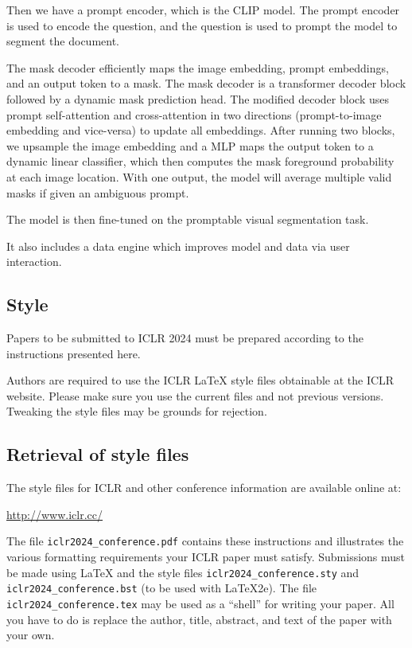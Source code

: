 \documentclass{article} %
\begin{document}
Then we have a prompt encoder, which is the CLIP model. The prompt encoder is used to encode the question, and the question is used to prompt the model to segment the document.

The mask decoder efficiently maps the image embedding, prompt embeddings, and an output token to a mask. The mask decoder is a transformer decoder block followed by a dynamic mask prediction head. The modified decoder block uses prompt self-attention and cross-attention in two directions (prompt-to-image embedding and vice-versa) to update all embeddings. After running two blocks, we upsample the image embedding and a MLP maps the output token to a dynamic linear classifier, which then computes the mask foreground probability at each image location. With one output, the model will average multiple valid masks if given an ambiguous prompt.

The model is then fine-tuned on the promptable visual segmentation task.

It also includes a data engine which improves model and data via user interaction. 

\subsection{Style}

Papers to be submitted to ICLR 2024 must be prepared according to the
instructions presented here.


Authors are required to use the ICLR \LaTeX{} style files obtainable at the
ICLR website. Please make sure you use the current files and
not previous versions. Tweaking the style files may be grounds for rejection.

\subsection{Retrieval of style files}

The style files for ICLR and other conference information are available online at:
\begin{center}
   \url{http://www.iclr.cc/}
\end{center}
The file \verb+iclr2024_conference.pdf+ contains these
instructions and illustrates the
various formatting requirements your ICLR paper must satisfy.
Submissions must be made using \LaTeX{} and the style files
\verb+iclr2024_conference.sty+ and \verb+iclr2024_conference.bst+ (to be used with \LaTeX{}2e). The file
\verb+iclr2024_conference.tex+ may be used as a ``shell'' for writing your paper. All you
have to do is replace the author, title, abstract, and text of the paper with
your own.
\end{document}
